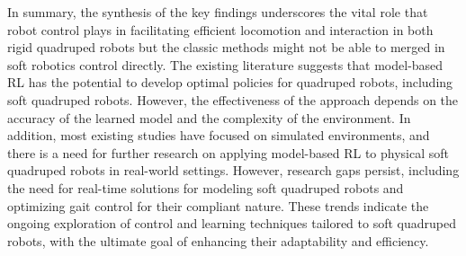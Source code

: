 In summary, the synthesis of the key findings underscores the vital role that robot control plays in facilitating efficient locomotion and interaction in both rigid quadruped robots but the classic methods might not be able to merged in soft robotics control directly. The existing literature suggests that model-based RL has the potential to develop optimal policies for quadruped robots, including soft quadruped robots. However, the effectiveness of the approach depends on the accuracy of the learned model and the complexity of the environment. In addition, most existing studies have focused on simulated environments, and there is a need for further research on applying model-based RL to physical soft quadruped robots in real-world settings. However, research gaps persist, including the need for real-time solutions for modeling soft quadruped robots and optimizing gait control for their compliant nature. These trends indicate the ongoing exploration of control and learning techniques tailored to soft quadruped robots, with the ultimate goal of enhancing their adaptability and efficiency.